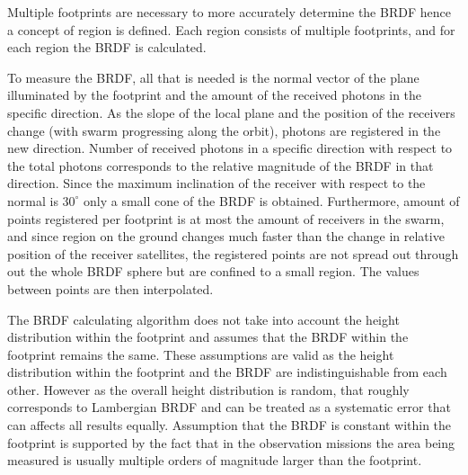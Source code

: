 Multiple footprints are necessary to more accurately determine the BRDF hence a concept of region is defined. Each region consists of multiple footprints, and for each region the BRDF is calculated.

To measure the BRDF, all that is needed is the normal vector of the plane  illuminated by the footprint and the amount of the received photons in the specific direction. As the slope of the local plane and the position of the receivers change (with swarm progressing along the orbit), photons are registered in the new direction. Number of received photons  in a specific direction with respect to the total photons corresponds to the relative magnitude of the BRDF in that direction. Since the maximum inclination of the receiver with respect to the normal is $30^\circ$ only a small cone of the BRDF is obtained. Furthermore, amount of points registered per footprint is at most the amount of receivers in the swarm, and since region on the ground changes much faster than the change in relative position of the receiver satellites, the registered points are not spread out through out the whole BRDF sphere but are confined to a small region. The values between points are then interpolated. 



The BRDF calculating algorithm does not take into account the height distribution within the footprint and assumes that the BRDF within the footprint remains the same. These assumptions are valid as the height distribution within the footprint and the BRDF are indistinguishable from each other. However as the overall height distribution is random, that roughly corresponds to Lambergian BRDF and can be treated as a systematic error that can affects all results equally. Assumption that the BRDF is constant within the footprint is supported by the fact that in the observation missions the area being measured is usually multiple orders of magnitude larger than the footprint. 






